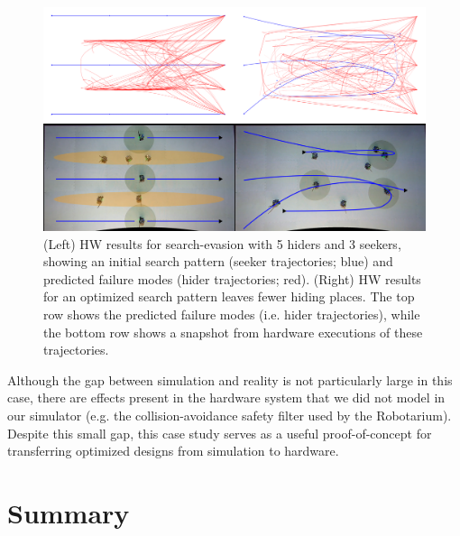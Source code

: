 \begin{figure}[tb]
    \centering
    \includegraphics[width=\linewidth]{images/corl/hw_results.png}
    \caption{(Left) HW results for search-evasion with 5 hiders and 3 seekers, showing an initial search pattern (seeker trajectories; blue) and predicted failure modes (hider trajectories; red). (Right) HW results for an optimized search pattern leaves fewer hiding places. The top row shows the predicted failure modes (i.e. hider trajectories), while the bottom row shows a snapshot from hardware executions of these trajectories.}
    \label{fig:hw_experimental_results}
\end{figure}

Although the gap between simulation and reality is not particularly large in this case, there are effects present in the hardware system that we did not model in our simulator (e.g. the collision-avoidance safety filter used by the Robotarium). Despite this small gap, this case study serves as a useful proof-of-concept for transferring optimized designs from simulation to hardware.
%



\section{Summary}

